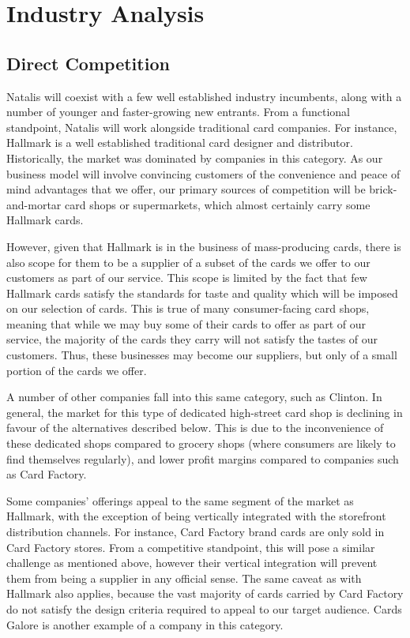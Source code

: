 \documentclass[10pt,a4paper]{article}
\begin{document}
\section*{Industry Analysis}
\subsection*{Direct Competition}


Natalis will coexist with a few well established industry incumbents, along with a number of younger and faster-growing new entrants. From a functional standpoint, Natalis will work alongside traditional card companies. For instance, Hallmark is a well established traditional card designer and distributor. Historically, the market was dominated by companies in this category. As our business model will involve convincing customers of the convenience and peace of mind advantages that we offer, our primary sources of competition will be brick-and-mortar card shops or supermarkets, which almost certainly carry some Hallmark cards.

However, given that Hallmark is in the business of mass-producing cards, there is also scope for them to be a supplier of a subset of the cards we offer to our customers as part of our service. This scope is limited by the fact that few Hallmark cards satisfy the standards for taste and quality which will be imposed on our selection of cards. This is true of many consumer-facing card shops, meaning that while we may buy some of their cards to offer as part of our service, the majority of the cards they carry will not satisfy the tastes of our customers. Thus, these businesses may become our suppliers, but only of a small portion of the cards we offer.

A number of other companies fall into this same category, such as Clinton. In general, the market for this type of dedicated high-street card shop is declining in favour of the alternatives described below. This is due to the inconvenience of these dedicated shops compared to grocery shops (where consumers are likely to find themselves regularly), and lower profit margins compared to companies such as Card Factory.

Some companies' offerings appeal to the same segment of the market as Hallmark, with the exception of being vertically integrated with the storefront distribution channels. For instance, Card Factory brand cards are only sold in Card Factory stores. From a competitive standpoint, this will pose a similar challenge as mentioned above, however their vertical integration will prevent them from being a supplier in any official sense. The same caveat as with Hallmark also applies, because the vast majority of cards carried by Card Factory do not satisfy the design criteria required to appeal to our target audience. Cards Galore is another example of a company in this category.
\end{document}
